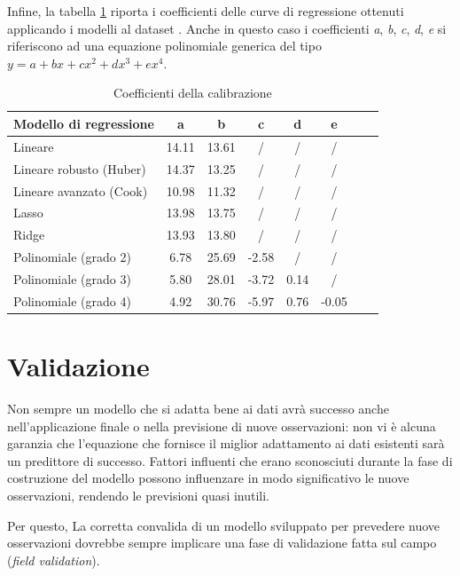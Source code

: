 Infine, la tabella \ref{fig:risultati-pm10-coefficienti} riporta i coefficienti delle curve di regressione ottenuti applicando i modelli al dataset . Anche in questo caso i coefficienti \textit{a}, \textit{b}, \textit{c}, \textit{d}, \textit{e} si riferiscono ad una equazione polinomiale generica del tipo $y=a+bx+cx^2+dx^3+ex^4$.

\begin{table}[H]
    \footnotesize
    \centering
    \begin{tabular}{|l|c|c|c|c|c|c|c|}
    \hline
        \textbf{Modello di regressione} & \textbf{a} & \textbf{b} & \textbf{c} & \textbf{d} & \textbf{e} \\ \hline
        Lineare & 14.11 & 13.61 & / & / & / \\ \hline
        Lineare robusto (Huber) & 14.37 & 13.25 & / & / & / \\ \hline
        Lineare avanzato (Cook) & 10.98 & 11.32 & / & / & / \\ \hline
        Lasso & 13.98 & 13.75 & / & / & / \\ \hline
        Ridge & 13.93 & 13.80 & / & / & / \\ \hline
        Polinomiale (grado 2) & 6.78 & 25.69 & -2.58 & / & / \\ \hline
        Polinomiale (grado 3) & 5.80 & 28.01 & -3.72 & 0.14 & / \\ \hline
        Polinomiale (grado 4) & 4.92 & 30.76 & -5.97 & 0.76 & -0.05 \\ \hline
    \end{tabular}
    \caption{Coefficienti della calibrazione }
    \label{fig:risultati-pm10-coefficienti}
\end{table}

\section{Validazione}\label{sec:validazione}

Non sempre un modello che si adatta bene ai dati avrà successo anche nell'applicazione finale o nella previsione di nuove osservazioni: non vi è alcuna garanzia che l'equazione che fornisce il miglior adattamento ai dati esistenti sarà un predittore di successo. Fattori influenti che erano sconosciuti durante la fase di costruzione del modello possono influenzare in modo significativo le nuove osservazioni, rendendo le previsioni quasi inutili.

Per questo, La corretta convalida di un modello sviluppato per prevedere nuove osservazioni dovrebbe sempre implicare una fase di validazione fatta sul campo (\textit{field validation}).

